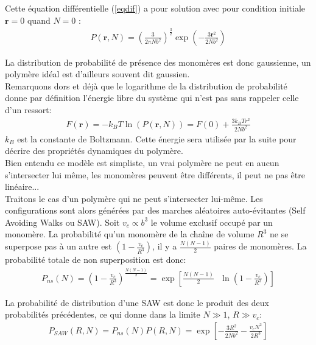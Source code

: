 \documentclass[a4paper,11pt]{article}
\begin{document}
Cette équation différentielle (\ref{eqdif}) a pour solution avec pour condition initiale $\textbf{r}=0$ quand $N=0$ :
\begin{eqnarray}
P(\textbf{r},N)=\left(\frac{3}{2\pi N b^2}\right)^\frac{3}{2}\exp\left(-\frac{3\textbf{r}^2}{2 N b^2}\right)
\end{eqnarray}

La distribution de probabilité de présence des monomères est donc gaussienne, un polymère idéal est d'ailleurs souvent dit gaussien.\\

Remarquons dors et déjà que le logarithme de la distribution de probabilité donne par définition l'énergie libre du système qui n'est pas sans rappeler celle d'un ressort:
\begin{eqnarray}
F(\textbf{r})= - k_B T \ln(P(\textbf{r},N))= F(0)+\frac{3k_BTr^2}{2Nb^2}
\label{elibre}
\end{eqnarray}
$k_B$ est la constante de Boltzmann. Cette énergie sera utilisée par la suite pour décrire des propriétés dynamiques du polymère.\\



Bien entendu ce modèle est simpliste, un vrai polymère ne peut en aucun s'intersecter lui même, les monomères peuvent être différents, il peut ne pas être linéaire...\\

 Traitons le cas d'un polymère qui ne peut s'intersecter lui-même. Les configurations sont alors générées par des marches aléatoires auto-évitantes (Self Avoiding Walks ou SAW). Soit $v_c \propto b^3$ le volume exclusif occupé par un monomère. La probabilité qu'un monomère de la chaîne de volume $R^3$ ne se superpose pas à un autre est $(1-\frac{v_c}{R^3})$, il y a $\frac{N(N-1)}{2}$ paires de monomères. La probabilité totale de non superposition est donc:
 \begin{eqnarray}
P_{ns}(N)= \left(1-\frac{v_c}{R^3}\right)^{\frac{N(N-1)}{2}} = \exp\left[\frac{N(N-1)}{2}\text{ }\ln\left(1-\frac{v_c}{R^3}\right)\right]
\end{eqnarray}

La probabilité de distribution d'une SAW est donc le produit des deux probabilités précédentes, ce qui donne dans la limite $N \gg 1$, $R \gg v_c$:
\begin{eqnarray}
P_{SAW}(R,N)=P_{ns}(N) P(R,N)=\exp\left[-\frac{3R^2}{2 N b^2}-\frac{v_cN^2}{2R^3}\right]
\end{eqnarray}
\end{document}
